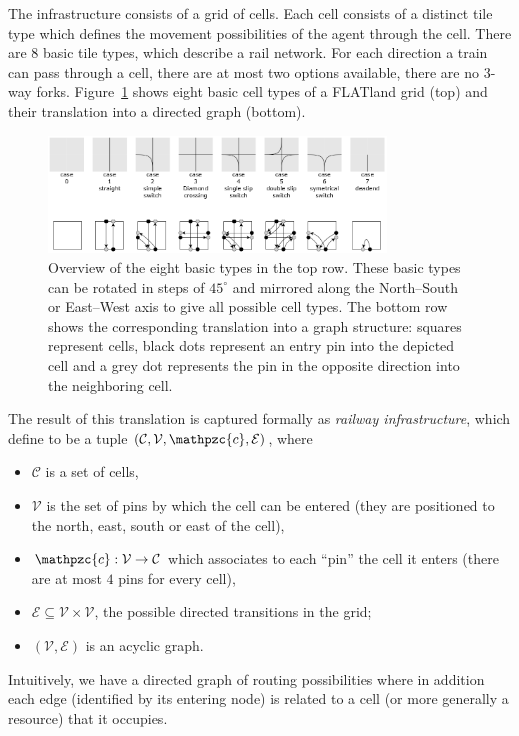 \documentclass{article}
\begin{document}
The infrastructure consists of a grid of cells. Each cell consists of a distinct tile type which defines the movement possibilities of the agent through the cell. There are 8 basic tile types, which describe a rail network. For each direction a train can pass through a cell, there are at most two options available, there are no 3-way forks.
%
Figure~\ref{fig:H1_railway_elements} shows eight basic cell types of a FLATland grid (top) and their translation into a directed graph (bottom).
%
\begin{figure}[hbtp]
	\centering
  \includegraphics[width=0.8\textwidth]{Figures/03_pipeline/H1_railway_elements.png}
	\caption{Overview of the eight basic types in the top row. These basic types can be rotated in steps of $45^\circ$ and mirrored along the North--South or East--West axis to give all possible cell types. The bottom row shows the corresponding translation into a graph structure: squares represent cells, black dots represent an entry pin into the depicted cell and a grey dot represents the pin in the opposite direction into the neighboring cell.}
	\label{fig:H1_railway_elements}
\end{figure}
%
The result of this translation is captured formally as \emph{railway infrastructure}, which define to be a tuple  $(\mathcal{C}, \mathcal{V}, \mathpzc{c}, \mathcal{E})$, where
\begin{itemize}
    \item $\mathcal{C}$ is a set of cells,
    \item $\mathcal{V}$ is the set of pins by which the cell can be entered (they are positioned to the north, east, south or east of the cell),
    \item $\mathpzc{c}: \mathcal{V} \to \mathcal{C}$ which associates to each ``pin'' the cell it enters (there are at most $4$ pins for every cell),
    \item $\mathcal{E} \subseteq \mathcal{V} \times \mathcal{V}$, the possible directed transitions in the grid;
    \item $(\mathcal{V},\mathcal{E})$ is an acyclic graph.
\end{itemize}
Intuitively, we have a directed graph of routing possibilities where in addition each edge (identified by its entering node) is related to a cell (or more generally a resource) that it occupies.
\end{document}
